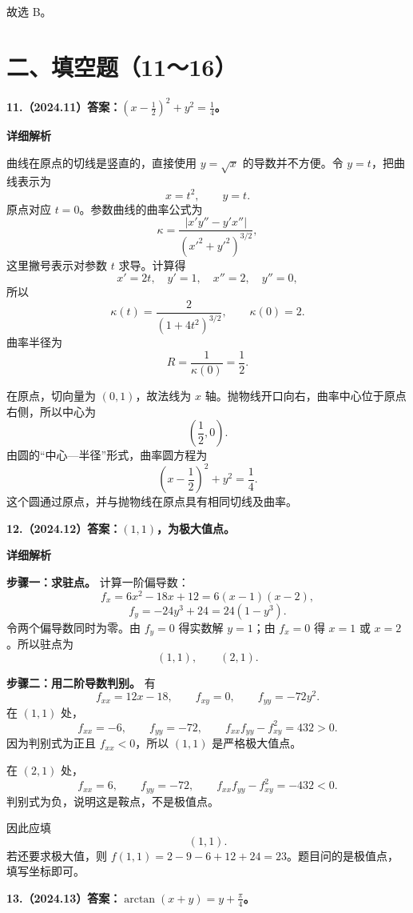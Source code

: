 \documentclass[UTF8,11pt,fontset=windows]{ctexart}
\begin{document}
故选 B。

\clearpage

\section*{二、填空题（11～16）}

\textbf{11.（2024.11）答案：$\displaystyle\left(x-\frac12\right)^2+y^2=\frac14$。}

\textbf{详细解析}

曲线在原点的切线是竖直的，直接使用 $y=\sqrt{x}$ 的导数并不方便。令 $y=t$，把曲线表示为
$$
x=t^2,\qquad y=t.
$$
原点对应 $t=0$。参数曲线的曲率公式为
$$
\kappa=\frac{|x'y''-y'x''|}{(x'^2+y'^2)^{3/2}},
$$
这里撇号表示对参数 $t$ 求导。计算得
$$
x'=2t,\quad y'=1,\quad x''=2,\quad y''=0,
$$
所以
$$
\kappa(t)=\frac2{(1+4t^2)^{3/2}},
\qquad \kappa(0)=2.
$$
曲率半径为
$$
R=\frac1{\kappa(0)}=\frac12.
$$

在原点，切向量为 $(0,1)$，故法线为 $x$ 轴。抛物线开口向右，曲率中心位于原点右侧，所以中心为
$$
\left(\frac12,0\right).
$$
由圆的“中心—半径”形式，曲率圆方程为
$$
\boxed{\left(x-\frac12\right)^2+y^2=\frac14}.
$$
这个圆通过原点，并与抛物线在原点具有相同切线及曲率。

\clearpage

\textbf{12.（2024.12）答案：$(1,1)$，为极大值点。}

\textbf{详细解析}

\textbf{步骤一：求驻点。} 计算一阶偏导数：
$$
f_x=6x^2-18x+12=6(x-1)(x-2),
$$
$$
f_y=-24y^3+24=24(1-y^3).
$$
令两个偏导数同时为零。由 $f_y=0$ 得实数解 $y=1$；由 $f_x=0$ 得 $x=1$ 或 $x=2$。所以驻点为
$$
(1,1),\qquad (2,1).
$$

\textbf{步骤二：用二阶导数判别。} 有
$$
f_{xx}=12x-18,\qquad f_{xy}=0,
\qquad f_{yy}=-72y^2.
$$
在 $(1,1)$ 处，
$$
f_{xx}=-6,\qquad f_{yy}=-72,
\qquad f_{xx}f_{yy}-f_{xy}^2=432>0.
$$
因为判别式为正且 $f_{xx}<0$，所以 $(1,1)$ 是严格极大值点。

在 $(2,1)$ 处，
$$
f_{xx}=6,\qquad f_{yy}=-72,
\qquad f_{xx}f_{yy}-f_{xy}^2=-432<0.
$$
判别式为负，说明这是鞍点，不是极值点。

因此应填
$$
\boxed{(1,1)}.
$$
若还要求极大值，则 $f(1,1)=2-9-6+12+24=23$。题目问的是极值点，填写坐标即可。

\clearpage

\textbf{13.（2024.13）答案：$\displaystyle\arctan(x+y)=y+\frac\pi4$。}
\end{document}
